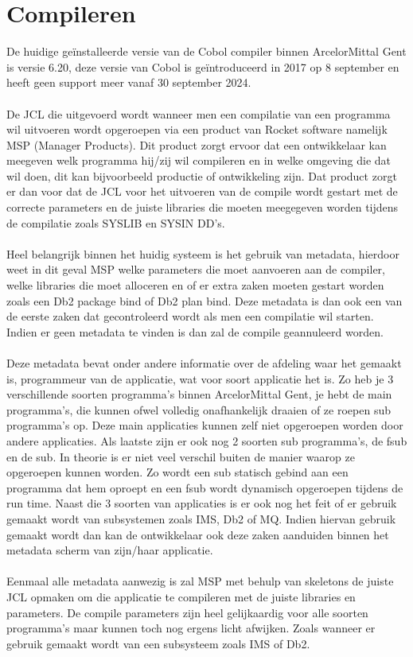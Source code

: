 \section{Compileren}
\label{sec:compileren}
De huidige geïnstalleerde versie van de Cobol compiler binnen ArcelorMittal Gent is versie 6.20, deze versie van Cobol is geïntroduceerd in 2017 op 8 september en heeft geen support meer vanaf 30 september 2024.
\\ \\
De JCL die uitgevoerd wordt wanneer men een compilatie van een programma wil uitvoeren wordt opgeroepen via een product van Rocket software namelijk MSP (Manager Products). Dit product zorgt ervoor dat een ontwikkelaar kan meegeven welk programma hij/zij wil compileren en in welke omgeving die dat wil doen, dit kan bijvoorbeeld productie of ontwikkeling zijn. Dat product zorgt er dan voor dat de JCL voor het uitvoeren van de compile wordt gestart met de correcte parameters en de juiste libraries die moeten meegegeven worden tijdens de compilatie zoals SYSLIB en SYSIN DD's.
\\ \\
Heel belangrijk binnen het huidig systeem is het gebruik van metadata, hierdoor weet in dit geval MSP welke parameters die moet aanvoeren aan de compiler, welke libraries die moet alloceren en of er extra zaken moeten gestart worden zoals een Db2 package bind of Db2 plan bind. Deze metadata is dan ook een van de eerste zaken dat gecontroleerd wordt als men een compilatie wil starten. Indien er geen metadata te vinden is dan zal de compile geannuleerd worden. 
\\ \\
Deze metadata bevat onder andere informatie over de afdeling waar het gemaakt is, programmeur van de applicatie, wat voor soort applicatie het is. Zo heb je 3 verschillende soorten programma's binnen ArcelorMittal Gent, je hebt de main programma's, die kunnen ofwel volledig onafhankelijk draaien of ze roepen sub programma's op. Deze main applicaties kunnen zelf niet opgeroepen worden door andere applicaties. Als laatste zijn er ook nog 2 soorten sub programma's, de fsub en de sub. In theorie is er niet veel verschil buiten de manier waarop ze opgeroepen kunnen worden. Zo wordt een sub statisch gebind aan een programma dat hem oproept en een fsub wordt dynamisch opgeroepen tijdens de run time. Naast die 3 soorten van applicaties is er ook nog het feit of er gebruik gemaakt wordt van subsystemen zoals IMS, Db2 of MQ. Indien hiervan gebruik gemaakt wordt dan kan de ontwikkelaar ook deze zaken aanduiden binnen het metadata scherm van zijn/haar applicatie. 
\\ \\
Eenmaal alle metadata aanwezig is zal MSP met behulp van skeletons de juiste JCL opmaken om die applicatie te compileren met de juiste libraries en parameters. De compile parameters zijn heel gelijkaardig voor alle soorten programma's maar kunnen toch nog ergens licht afwijken. Zoals wanneer er gebruik gemaakt wordt van een subsysteem zoals IMS of Db2.
\\ \\

